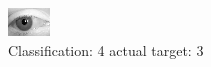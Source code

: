 \begin{figure}[h!]
\begin{center}
\includegraphics[width=0.60\columnwidth]{figures/ID2803_class_4_target_3.png}
\end{center}
\caption{ Classification: 4 actual target: 3}
\label{fig:ID2803_class_4_target_3}
\end{figure}

